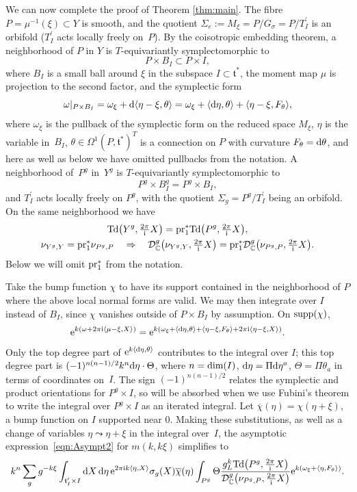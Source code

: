 \documentclass[pdftex]{sigma}
\numberwithin{equation}{section}
\newcommand{\pair}[2]{\langle #1, #2 \rangle}
\newcommand{\ol}[1]{\overline{#1}}
\renewcommand{\i}{{\mathrm{i}}}
\def\t{\ensuremath{\mathfrak{t}}}
\def\bC{\ensuremath{\mathbb{C}}}
\def\supp{\ensuremath{\textnormal{supp}}}
\def\pr{\ensuremath{\textnormal{pr}}}
\def\dim{\ensuremath{\textnormal{dim}}}
\def\Td{\ensuremath{\textnormal{Td}}}
\def\calDC{\ensuremath{\mathcal{D}_{\bC}}}
\def\supp{\ensuremath{\textnormal{supp}}}
\begin{document}
 We can now complete the proof of Theorem \ref{thm:main}. The fibre $P=\mu^{-1}(\xi) \subset Y$ is smooth, and the quotient $\Sigma_e:=M_\xi=P/G_\sigma=P/T_I^\prime$ is an orbifold ($T_I^\prime$ acts locally freely on~$P$). By the coisotropic embedding theorem, a neighborhood of $P$ in $Y$ is $T$-equivariantly symplectomorphic to
\[ P \times B_I \subset P \times I, \]
where $B_I$ is a small ball around $\xi$ in the subspace $I \subset \t^\ast$, the moment map $\mu$ is projection to the second factor, and the symplectic form
\[ \omega|_{P\times B_I}=\omega_\xi+{\rm d}\pair{\eta-\xi}{\theta}=\omega_\xi+\pair{{\rm d}\eta}{\theta}+\pair{\eta-\xi}{F_\theta},\]
where $\omega_\xi$ is the pullback of the symplectic form on the reduced space $M_\xi$, $\eta$ is the variable in~$B_I$, $\theta \in \Omega^1(P,\t^\ast)^T$ is a connection on $P$ with curvature $F_\theta={\rm d}\theta$, and here as well as below we have omitted pullbacks from the notation. A neighborhood of~$P^g$ in~$Y^g$ is $T$-equivariantly symplectomorphic to
\[ P^g \times B_I^g=P^g \times B_I,\]
and $T_I^\prime$ acts locally freely on $P^g$, with the quotient $\Sigma_g=P^g/T_I^\prime$ being an orbifold. On the same neighborhood we have{\samepage
\begin{gather*} \Td\big(Y^g,\tfrac{2\pi}{\i}X\big)=\pr_1^\ast \Td\big(P^g,\tfrac{2\pi}{\i}X\big),\\
\nu_{Y^g,Y}=\pr_1^\ast \nu_{P^g,P} \quad \Rightarrow \quad \calDC^g\big(\nu_{Y^g,Y},\tfrac{2\pi}{\i}X\big)=\pr_1^\ast \calDC^g\big(\nu_{P^g,P},\tfrac{2\pi}{\i}X\big).
\end{gather*}
Below we will omit $\pr_1^\ast$ from the notation.}

Take the bump function $\chi$ to have its support contained in the neighborhood of $P$ where the above local normal forms are valid. We may then integrate over $I$ instead of $B_I$, since $\chi$ vanishes outside of $P\times B_I$ by assumption. On $\supp(\chi)$,
\[ {\rm e}^{k(\omega+2\pi \i\pair{\mu-\xi}{X})}={\rm e}^{k(\omega_\xi+\pair{{\rm d}\eta}{\theta}+\pair{\eta-\xi}{F_\theta}+2\pi \i\pair{\eta-\xi}{X})}.\]
Only the top degree part of ${\rm e}^{k\pair{{\rm d}\eta}{\theta}}$ contributes to the integral over $I$; this top degree part is $(-1)^{n(n-1)/2}k^n {\rm d}\eta \cdot \Theta$, where $n=\dim(I)$, ${\rm d}\eta=\Pi  {\rm d}\eta^a$, $\Theta=\Pi \theta_a$ in terms of coordinates on~$I$. The sign $(-1)^{n(n-1)/2}$ relates the symplectic and product orientations for $P^g \times I$, so will be absorbed when we use Fubini's theorem to write the integral over $P^g\times I$ as an iterated integral. Let $\ol{\chi}(\eta)=\chi(\eta+\xi)$, a bump function on $I$ supported near $0$. Making these substitutions, as well as a change of variables $\eta \leadsto \eta+\xi$ in the integral over~$I$, the asymptotic expression~\eqref{eqn:Asympt2} for $m(k,k\xi)$ simplifies to
\begin{gather*}%
k^n\sum_g g^{-k\xi} \int_{\t_I^\prime \times I} {\rm d}X\, {\rm d}\eta\,{\rm e}^{2\pi \i k\pair{\eta}{X}} \sigma_g(X)\ol{\chi}(\eta) \int_{P^g} \Theta \frac{g_L^k\Td\big(P^g,\tfrac{2\pi}{\i}X\big)}{\calDC^g\big(\nu_{P^g,P},\tfrac{2\pi}{\i}X\big)}{\rm e}^{k(\omega_\xi+\pair{\eta}{F_\theta})}.
\end{gather*}
\end{document}
